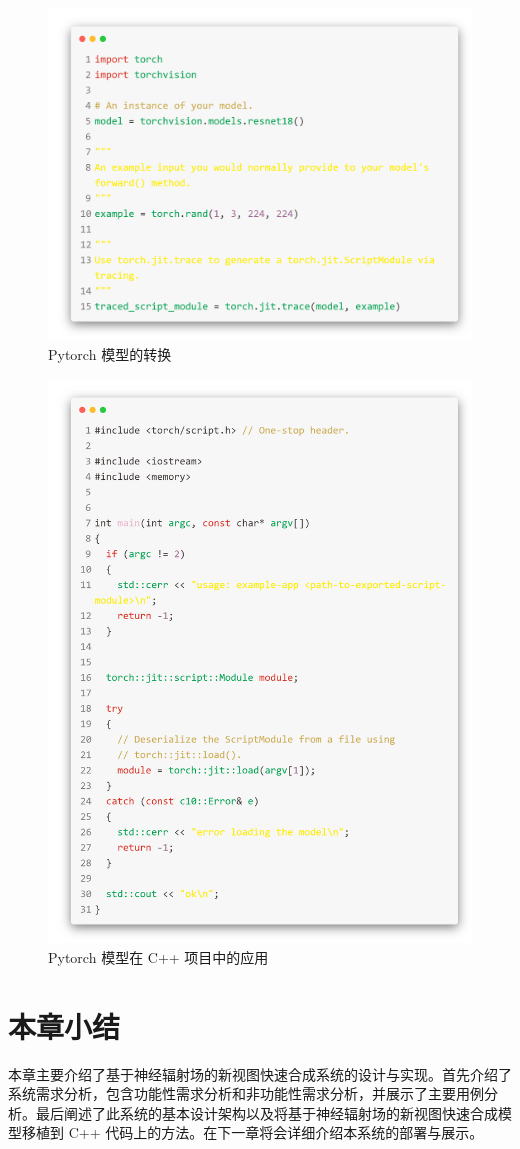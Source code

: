 \begin{figure}[htb]
    \centering
    \includegraphics[width=0.98\linewidth]{figures/code-pytorch-big.png}
    \caption{Pytorch 模型的转换}
    \label{fig:code_pytorch}
\end{figure}

\begin{figure}[H]
    \centering
    \includegraphics[width=0.98\linewidth]{figures/code-cpp-big.png}
    \caption{Pytorch 模型在 C++ 项目中的应用}
    \label{fig:code_cpp}
\end{figure}

\pagebreak

\section{本章小结}
本章主要介绍了基于神经辐射场的新视图快速合成系统的设计与实现。首先介绍了系统需求分析，包含功能性需求分析和非功能性需求分析，并展示了主要用例分析。最后阐述了此系统的基本设计架构以及将基于神经辐射场的新视图快速合成模型移植到 C++ 代码上的方法。在下一章将会详细介绍本系统的部署与展示。

\cleardoublepage

